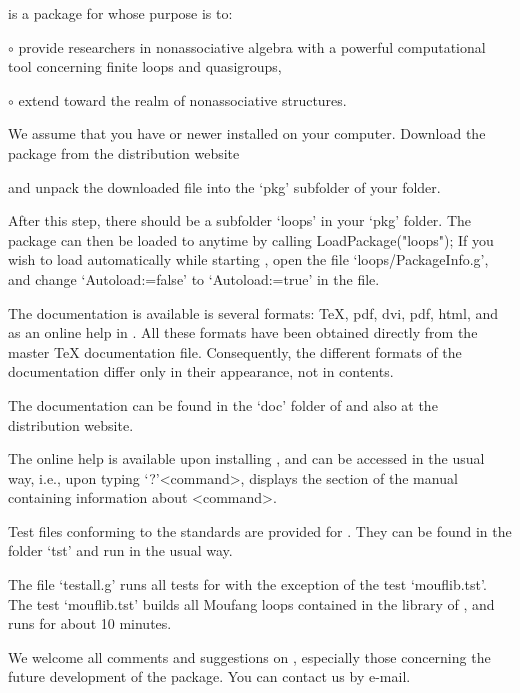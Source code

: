
{\LOOPS} is a package for  whose purpose is to:
\beginlist%
\item{$\circ$}
    provide researchers in nonassociative algebra with a powerful computational tool
    concerning finite loops and quasigroups,
\item{$\circ$}
    extend {\GAP} toward the realm of nonassociative structures.
\endlist


We assume that you have  or newer installed on your computer.
Download the {\LOOPS} package from the distribution website


and unpack the downloaded file into the `pkg' subfolder of your {\GAP} folder.

After this step, there should be a subfolder `loops' in your `pkg' folder. The
package {\LOOPS} can then be loaded to {\GAP} anytime by calling
\begintt
LoadPackage("loops");
\endtt
If you wish to load {\LOOPS} automatically while starting {\GAP}, open the file
`loops/PackageInfo.g', and change `Autoload:=false' to
`Autoload:=true' in the file.


The documentation is available is several formats: \TeX, pdf, dvi, pdf, html,
and as an online help in {\GAP}. All these formats have been obtained directly
from the master {\TeX} documentation file. Consequently, the different formats
of the documentation differ only in their appearance, not in contents.

The documentation can be found in the `doc' folder of {\LOOPS} and also at the
{\LOOPS} distribution website.

The online {\GAP} help is available upon installing {\LOOPS}, and can be
accessed in the usual way, i.e., upon typing `?'<command>, {\GAP} displays the
section of the {\LOOPS} manual containing information about <command>.


Test files conforming to the {\GAP} standards are provided for {\LOOPS}. They
can be found in the folder `tst' and run in the usual way.

The file `testall.g' runs all tests for {\LOOPS} with the exception of the test
`mouflib.tst'. The test `mouflib.tst' builds all Moufang loops contained in the
library of {\LOOPS}, and runs for about 10 minutes.


We welcome all comments and suggestions on {\LOOPS}, especially those
concerning the future development of the package. You can contact us by e-mail.
